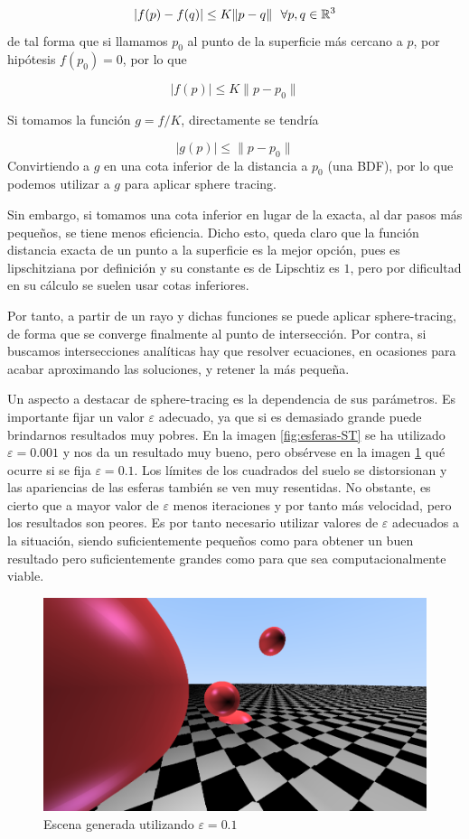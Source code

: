 $$
|f(p)-f(q)|\leq K \|p-q\| \ \ \forall p,q\in\mathbb{R}^3 
$$
de tal forma que si llamamos $p_0$ al punto de la superficie más cercano a $p$, por hipótesis $f(p_0)=0$, por lo que

$$
|f(p)|\leq K \| p-p_0\|
$$

Si tomamos la función $g=f/K$, directamente se tendría 

$$
|g(p)|\leq\|p-p_0\|
$$
Convirtiendo a $g$ en una cota inferior de la distancia a $p_0$ (una BDF), por lo que podemos utilizar a $g$ para aplicar sphere tracing.

Sin embargo, si tomamos una cota inferior en lugar de la exacta, al dar pasos más pequeños, se tiene menos eficiencia. Dicho esto, queda claro que la función distancia exacta de un punto a la superficie es la mejor opción, pues es lipschitziana por definición y su constante es de Lipschtiz es $1$, pero por dificultad en su cálculo se suelen usar cotas inferiores.

Por tanto, a partir de un rayo y dichas funciones se puede aplicar sphere-tracing, de forma que se converge finalmente al punto de intersección. Por contra, si buscamos intersecciones analíticas hay que resolver ecuaciones, en ocasiones para acabar aproximando las soluciones, y retener la más pequeña. 

Un aspecto a destacar de sphere-tracing es la dependencia de sus parámetros. Es importante fijar un valor $\varepsilon$ adecuado, ya que si es demasiado grande puede brindarnos resultados muy pobres. En la imagen \ref{fig:esferas-ST} se ha utilizado $\varepsilon=0.001$ y nos da un resultado muy bueno, pero obsérvese en la imagen \ref{fig:epsilon-grande} qué ocurre si se fija $\varepsilon=0.1$. Los límites de los cuadrados del suelo se distorsionan y las apariencias de las esferas también se ven muy resentidas. No obstante, es cierto que a mayor valor de $\varepsilon$ menos iteraciones y por tanto más velocidad, pero los resultados son peores. Es por tanto necesario utilizar valores de $\varepsilon$ adecuados a la situación, siendo suficientemente pequeños como para obtener un buen resultado pero suficientemente grandes como para que sea computacionalmente viable.

\begin{figure} [ht]
    \centering
    \includegraphics[scale = 0.3]{img/C9/epsilon-grande.png}
    \caption{Escena generada utilizando $\varepsilon=0.1$}
    \label{fig:epsilon-grande}
\end{figure}

